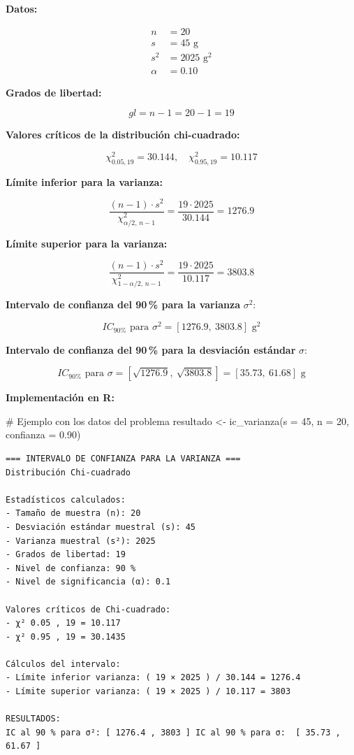 \documentclass[
  spanish,
  letterpaper,
]{book}
\newenvironment{Shaded}{\begin{snugshade}}{\end{snugshade}}
\newcommand{\AttributeTok}[1]{\textcolor[rgb]{0.40,0.45,0.13}{#1}}
\newcommand{\CommentTok}[1]{\textcolor[rgb]{0.37,0.37,0.37}{#1}}
\newcommand{\DecValTok}[1]{\textcolor[rgb]{0.68,0.00,0.00}{#1}}
\newcommand{\FloatTok}[1]{\textcolor[rgb]{0.68,0.00,0.00}{#1}}
\newcommand{\FunctionTok}[1]{\textcolor[rgb]{0.28,0.35,0.67}{#1}}
\newcommand{\NormalTok}[1]{\textcolor[rgb]{0.00,0.23,0.31}{#1}}
\newcommand{\OtherTok}[1]{\textcolor[rgb]{0.00,0.23,0.31}{#1}}
\begin{document}
\textbf{Datos:}

\[
\begin{aligned}
n &= 20 \\
s &= 45 \text{ g} \\
s^2 &= 2025 \text{ g}^2 \\
\alpha &= 0.10
\end{aligned}
\]

\textbf{Grados de libertad:}

\[
gl = n - 1 = 20 - 1 = 19
\]

\textbf{Valores críticos de la distribución chi-cuadrado:}

\[
\chi^2_{0.05, 19} = 30.144, \quad \chi^2_{0.95, 19} = 10.117
\]

\textbf{Límite inferior para la varianza:}

\[
\frac{(n - 1) \cdot s^2}{\chi^2_{\alpha/2, \, n-1}} = \frac{19 \cdot 2025}{30.144} = 1276.9
\]

\textbf{Límite superior para la varianza:}

\[
\frac{(n - 1) \cdot s^2}{\chi^2_{1 - \alpha/2, \, n-1}} = \frac{19 \cdot 2025}{10.117} = 3803.8
\]

\textbf{Intervalo de confianza del 90\,\% para la varianza}
\(\sigma^2\):

\[
IC_{90\%} \text{ para } \sigma^2 = [1276.9,\ 3803.8] \text{ g}^2
\]

\textbf{Intervalo de confianza del 90\,\% para la desviación estándar}
\(\sigma\):

\[
IC_{90\%} \text{ para } \sigma = [\sqrt{1276.9},\ \sqrt{3803.8}] = [35.73,\ 61.68] \text{ g}
\]

\textbf{Implementación en R:}

\begin{Shaded}
\begin{Highlighting}[]
\CommentTok{\# Ejemplo con los datos del problema}
\NormalTok{resultado }\OtherTok{\textless{}{-}} \FunctionTok{ic\_varianza}\NormalTok{(}\AttributeTok{s =} \DecValTok{45}\NormalTok{, }\AttributeTok{n =} \DecValTok{20}\NormalTok{, }\AttributeTok{confianza =} \FloatTok{0.90}\NormalTok{)}
\end{Highlighting}
\end{Shaded}

\begin{verbatim}
=== INTERVALO DE CONFIANZA PARA LA VARIANZA ===
Distribución Chi-cuadrado

Estadísticos calculados:
- Tamaño de muestra (n): 20 
- Desviación estándar muestral (s): 45 
- Varianza muestral (s²): 2025 
- Grados de libertad: 19 
- Nivel de confianza: 90 %
- Nivel de significancia (α): 0.1 

Valores críticos de Chi-cuadrado:
- χ² 0.05 , 19 = 10.117 
- χ² 0.95 , 19 = 30.1435 

Cálculos del intervalo:
- Límite inferior varianza: ( 19 × 2025 ) / 30.144 = 1276.4 
- Límite superior varianza: ( 19 × 2025 ) / 10.117 = 3803 

RESULTADOS:
IC al 90 % para σ²: [ 1276.4 , 3803 ] IC al 90 % para σ:  [ 35.73 , 61.67 ] 
\end{verbatim}
\end{document}
